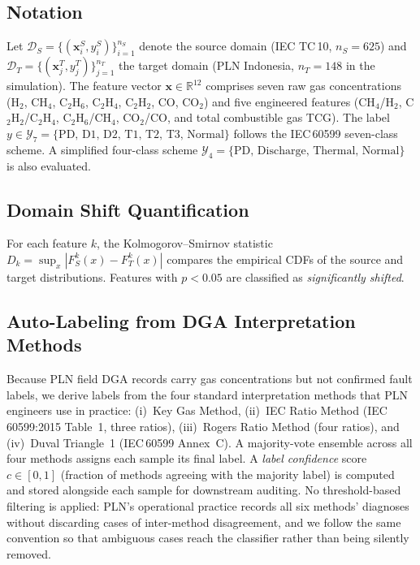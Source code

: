 \documentclass[conference]{IEEEtran}
\begin{document}
\subsection{Notation}
Let $\mathcal{D}_S = \{(\mathbf{x}_i^S, y_i^S)\}_{i=1}^{n_S}$ denote
the source domain (IEC TC\,10, $n_S = 625$) and
$\mathcal{D}_T = \{(\mathbf{x}_j^T, y_j^T)\}_{j=1}^{n_T}$ the target
domain (PLN Indonesia, $n_T = 148$ in the simulation).
The feature vector $\mathbf{x} \in \mathbb{R}^{12}$ comprises
seven raw gas concentrations (H$_2$, CH$_4$, C$_2$H$_6$, C$_2$H$_4$,
C$_2$H$_2$, CO, CO$_2$) and five engineered features
(CH$_4$/H$_2$, C$_2$H$_2$/C$_2$H$_4$, C$_2$H$_6$/CH$_4$,
CO$_2$/CO, and total combustible gas TCG).
The label $y \in \mathcal{Y}_7 = \{\text{PD, D1, D2, T1, T2, T3, Normal}\}$
follows the IEC\,60599 seven-class scheme.
A simplified four-class scheme
$\mathcal{Y}_4 = \{\text{PD, Discharge, Thermal, Normal}\}$
is also evaluated.

\subsection{Domain Shift Quantification}
For each feature $k$, the Kolmogorov--Smirnov statistic
$D_k = \sup_x |F_S^k(x) - F_T^k(x)|$
compares the empirical CDFs of the source and target distributions.
Features with $p < 0.05$ are classified as \emph{significantly shifted}.

\subsection{Auto-Labeling from DGA Interpretation Methods}
Because PLN field DGA records carry gas concentrations but not
confirmed fault labels, we derive labels from the four standard
interpretation methods that PLN engineers use in practice:
(i)~Key Gas Method,
(ii)~IEC Ratio Method (IEC\,60599:2015 Table~1, three ratios),
(iii)~Rogers Ratio Method (four ratios), and
(iv)~Duval Triangle~1 (IEC\,60599 Annex~C).
A majority-vote ensemble across all four methods assigns each sample
its final label.
A \emph{label confidence} score $c \in [0, 1]$ (fraction of methods
agreeing with the majority label) is computed and stored alongside
each sample for downstream auditing.
No threshold-based filtering is applied: PLN's operational practice
records all six methods' diagnoses without discarding cases of
inter-method disagreement, and we follow the same convention so
that ambiguous cases reach the classifier rather than being silently
removed.
\end{document}
